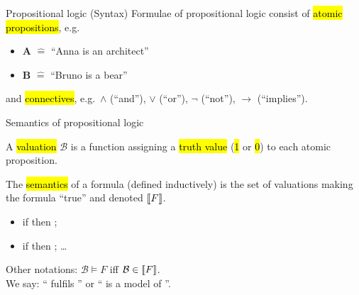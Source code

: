 
\begin{frame}{Propositional logic (Syntax)}
Formulae of propositional logic consist of \hl{atomic propositions}, e.g.
\bigskip
\begin{itemize}
  \itemsep1em
  \item[] $\mathbf{A}$ \quad $\widehat=$ \quad ``Anna is an architect''
  \item[] $\mathbf{B}$ \quad $\widehat=$ \quad ``Bruno is a bear''
\end{itemize}
\bigskip
and \hl{connectives}, e.g.\ $\land$ (``and''),
    $\lor$ (``or''), $\neg$ (``not''),
    $\to$ (``implies'').
\end{frame}


\begin{frame}{Semantics of propositional logic}

A \hl{valuation} $\mathcal{B}$ is a function assigning 
a \hl{truth value} (\hl{1} or \hl{0}) to each atomic proposition.

\bigskip
The \hl{semantics} of a formula (defined inductively) is the set of valuations
making the formula ``true'' and denoted $\lbrack\!\lbrack{F}\rbrack\!\rbrack$.

\begin{itemize}
  \item[] if  then ;
  \item[] if  then ; \ldots
\end{itemize}

\bigskip
Other notations: $\mathcal{B}\models F$ iff $\mathcal{B}\in\lbrack\!\lbrack{F}\rbrack\!\rbrack$.\\
We say: `` fulfils '' or `` is a model of ''.
\end{frame}


